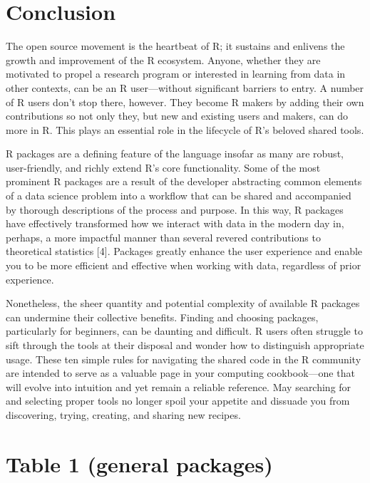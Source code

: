 \documentclass[10pt,letterpaper]{article}
\begin{document}
\hypertarget{conclusion}{%
\section{Conclusion}\label{conclusion}}

The open source movement is the heartbeat of R; it sustains and enlivens
the growth and improvement of the R ecosystem. Anyone, whether they are
motivated to propel a research program or interested in learning from
data in other contexts, can be an R user---without significant barriers
to entry. A number of R users don't stop there, however. They become R
makers by adding their own contributions so not only they, but new and
existing users and makers, can do more in R. This plays an essential
role in the lifecycle of R's beloved shared tools.

R packages are a defining feature of the language insofar as many are
robust, user-friendly, and richly extend R's core functionality. Some of
the most prominent R packages are a result of the developer abstracting
common elements of a data science problem into a workflow that can be
shared and accompanied by thorough descriptions of the process and
purpose. In this way, R packages have effectively transformed how we
interact with data in the modern day in, perhaps, a more impactful
manner than several revered contributions to theoretical statistics
{[}4{]}. Packages greatly enhance the user experience and enable you to
be more efficient and effective when working with data, regardless of
prior experience.

Nonetheless, the sheer quantity and potential complexity of available R
packages can undermine their collective benefits. Finding and choosing
packages, particularly for beginners, can be daunting and difficult. R
users often struggle to sift through the tools at their disposal and
wonder how to distinguish appropriate usage. These ten simple rules for
navigating the shared code in the R community are intended to serve as a
valuable page in your computing cookbook---one that will evolve into
intuition and yet remain a reliable reference. May searching for and
selecting proper tools no longer spoil your appetite and dissuade you
from discovering, trying, creating, and sharing new recipes.

\hypertarget{table-1-general-packages}{%
\section{Table 1 (general packages)}\label{table-1-general-packages}}
\end{document}
